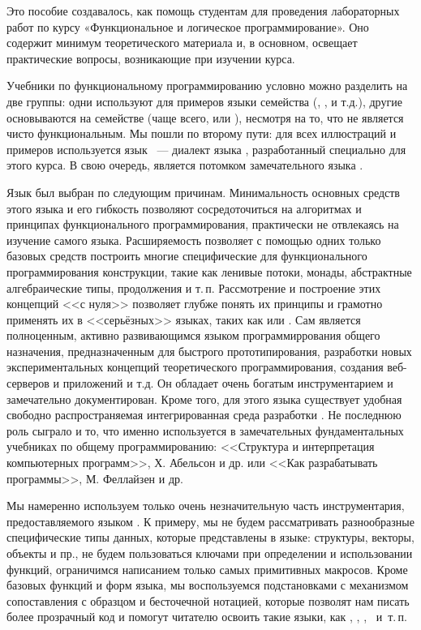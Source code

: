 \small

Это пособие создавалось, как помощь студентам для проведения лабораторных работ по курсу «Функциональное и логическое программирование». Оно содержит минимум теоретического материала и, в основном, освещает практические вопросы, возникающие при изучении курса. 

Учебники по функциональному программированию условно можно разделить на две группы: одни используют для примеров языки семейства  (, ,  и т.д.), другие основываются на семействе  (чаще всего,  или ), несмотря на то, что  не является чисто функциональным. Мы пошли по второму пути: для всех иллюстраций и примеров используется язык \Scheme~--- диалект языка \Racket, разработанный специально для этого курса. В свою очередь, \Racket является потомком замечательного языка .

Язык  был выбран по следующим причинам. Минимальность основных средств этого языка и его гибкость позволяют сосредоточиться на алгоритмах и принципах функционального программирования, практически не отвлекаясь на изучение самого языка. Расширяемость \Racket позволяет с помощью одних только базовых средств построить многие специфические для функционального программирования конструкции, такие как ленивые потоки, монады, абстрактные алгебраические типы, продолжения и т.\,п. Рассмотрение и построение этих концепций <<с нуля>> позволяет глубже понять их принципы и грамотно применять их в <<серьёзных>> языках, таких как  или .
Сам  является полноценным, активно развивающимся языком программиррования общего назначения, предназначенным для быстрого прототипирования, разработки новых экспериментальных концепций теоретического программирования, создания веб-серверов и приложений и т.д. Он обладает очень богатым инструментарием и замечательно документирован. Кроме того, для этого языка существует удобная свободно распространяемая интегрированная среда разработки . Не последнюю роль сыграло и то, что именно  используется в замечательных фундаментальных учебниках по общему программированию: <<Структура и интерпретация компьютерных программ>>, Х. Абельсон и др. или <<Как разрабатывать программы>>, М. Феллайзен и др. 

Мы намеренно используем только очень незначительную часть инструментария, предоставляемого языком \Racket. К примеру, мы не будем рассматривать разнообразные специфические типы данных, которые представлены в языке: структуры, векторы, объекты и пр., не будем пользоваться ключами при определении и использовании функций, ограничимся написанием только самых примитивных макросов. Кроме базовых функций и форм языка, мы воспользуемся подстановками с механизмом сопоставления с образцом и бесточечной нотацией, которые позволят нам писать более прозрачный код и помогут читателю освоить такие языки, как , , , ~и~т.\,п.
 
